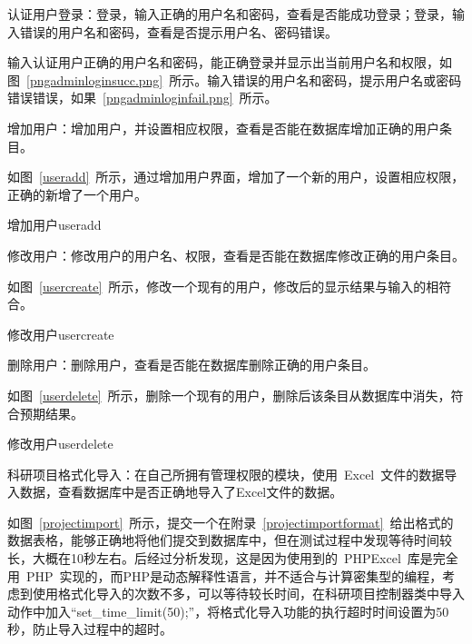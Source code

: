 认证用户登录：登录，输入正确的用户名和密码，查看是否能成功登录；登录，输入错误的用户名和密码，查看是否提示用户名、密码错误。

输入认证用户正确的用户名和密码，能正确登录并显示出当前用户名和权限，如图~\ref{pngadminloginsucc.png}~所示。输入错误的用户名和密码，提示用户名或密码错误错误，如果~\ref{pngadminloginfail.png}~所示。

增加用户：增加用户，并设置相应权限，查看是否能在数据库增加正确的用户条目。

如图~\ref{useradd}~所示，通过增加用户界面，增加了一个新的用户，设置相应权限，正确的新增了一个用户。
\begin{pics}[H]{增加用户}{useradd}
\end{pics}

修改用户：修改用户的用户名、权限，查看是否能在数据库修改正确的用户条目。

如图~\ref{usercreate}~所示，修改一个现有的用户，修改后的显示结果与输入的相符合。
\begin{pics}[H]{修改用户}{usercreate}
\end{pics}

删除用户：删除用户，查看是否能在数据库删除正确的用户条目。

如图~\ref{userdelete}~所示，删除一个现有的用户，删除后该条目从数据库中消失，符合预期结果。
\begin{pics}[H]{修改用户}{userdelete}
\end{pics}


科研项目格式化导入：在自己所拥有管理权限的模块，使用~Excel~文件的数据导入数据，查看数据库中是否正确地导入了Excel文件的数据。

如图~\ref{projectimport}~所示，提交一个在附录~\ref{projectimportformat}~给出格式的数据表格，能够正确地将他们提交到数据库中，但在测试过程中发现等待时间较长，大概在10秒左右。后经过分析发现，这是因为使用到的~PHPExcel~库是完全用~PHP~实现的，而PHP是动态解释性语言，并不适合与计算密集型的编程，考虑到使用格式化导入的次数不多，可以等待较长时间，在科研项目控制器类中导入动作中加入“set\_time\_limit(50);”，将格式化导入功能的执行超时时间设置为50秒，防止导入过程中的超时。

